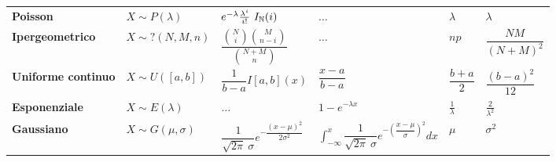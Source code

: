 \begin{sidewaystable}
\begin{tabular}{llllll}
		\bfseries Poisson           & $X\sim P(\lambda)$    & $e^{-\lambda}\frac{\lambda^i}{i!} ~ I_\mathbb N(i)$                     & $\dots$                                                                                                    & $\lambda$           & $\lambda$                  \\[2ex]
		\bfseries Ipergeometrico    & $X\sim ?(N,M,n)$      & $\dfrac{\binom{N}{i}\binom{M}{n-i}}{\binom{N+M}{n}}$             & $\dots$                                                                                                    & $np$                & $\dfrac{NM}{(N+M)^2}$      \\[2ex]
		\bfseries Uniforme continuo & $X\sim U([a,b])$      & $\dfrac{1}{b-a} I[a,b](x)$                                       & $ \dfrac{x-a}{b-a}$                                                                                        & $\dfrac{b+a}{2}$    & $\dfrac{(b-a)^2}{12}$      \\[3ex]
		\bfseries Esponenziale      & $X\sim E(\lambda)$    & $\dots$                                                          & $1-e^{-\lambda x}$                                                                                         & $\frac{1}{\lambda}$ & $\frac{2}{\lambda^2}$      \\[1ex]
		\bfseries Gaussiano         & $X\sim G(\mu,\sigma)$ & $\dfrac{1}{\sqrt{2\pi}~\sigma}e^{-\dfrac{(x-\mu)^2}{2\sigma^2}}$ & $\displaystyle\int_{-\infty}^x \dfrac{1}{\sqrt{2\pi}~\sigma} e^{-\left(\dfrac{x-\mu}{\sigma}\right)^2} dx$ & $\mu$               & $\sigma^2$                 \\
		\bottomrule
	\end{tabular}
\end{sidewaystable}
